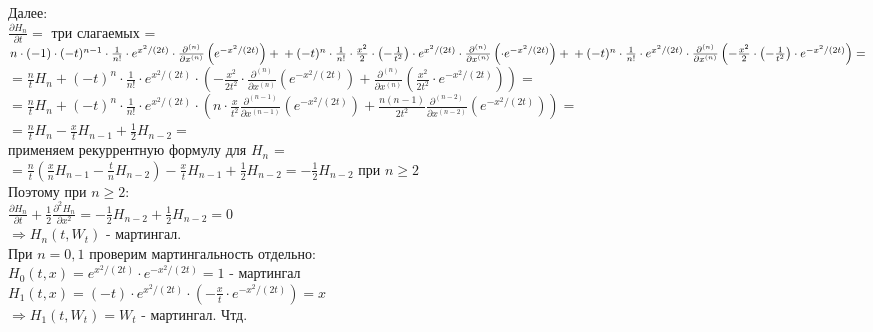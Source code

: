 \documentclass[12pt]{article}
\begin{document}
 Далее:\\
 $\frac {\partial H_n}{\partial t} =$ {три слагаемых} = \\
$ n \cdot (-1) \cdot  (-t)^{n-1} \cdot \frac{1}{n!}  \cdot e^{x^2/(2t)} \cdot  \frac {\partial^{(n)}}{\partial x^{(n)}} \left( e^{-x^2/(2t)} \right) + \\
 +(-t)^n \cdot \frac{1}{n!}  \cdot \frac{x^2}{2} \cdot \left( -\frac{1}{t^2} \right)  \cdot e^{x^2/(2t)} \cdot  \frac {\partial^{(n)}}{\partial x^{(n)}} \left( \cdot e^{-x^2/(2t)} \right) +\\
+ (-t)^n \cdot \frac{1}{n!}  \cdot e^{x^2/(2t)} \cdot  \frac {\partial^{(n)}}{\partial x^{(n)}} \left( - \frac{x^2}{2}\cdot \left( -\frac{1}{t^2} \right)   \cdot e^{-x^2/(2t)} \right)=$\\
$=\frac{n}{t}H_n +  (-t)^n \cdot \frac{1}{n!}  \cdot e^{x^2/(2t)} \cdot \left(  -\frac{x^2}{2t^2} \cdot  \frac {\partial^{(n)}}{\partial x^{(n)}} \left( e^{-x^2/(2t)} \right) + \frac {\partial^{(n)}}{\partial x^{(n)}} \left(  \frac{x^2}{2t^2} \cdot e^{-x^2/(2t)} \right) \right)=$\\
$=\frac{n}{t}H_n +  
(-t)^n \cdot \frac{1}{n!}  \cdot e^{x^2/(2t)} \cdot \left( n \cdot \frac{x}{t^2} \frac {\partial^{(n-1)}}{\partial x^{(n-1)}} \left( e^{-x^2/(2t)} \right)  + 
\frac{n(n-1)}{2t^2} \frac {\partial^{(n-2)}}{\partial x^{(n-2)}} \left( e^{-x^2/(2t)} \right) \right)=$\\
$=\frac{n}{t}H_n -\frac{x}{t}H_{n-1} + \frac{1}{2}H_{n-2} =$\\
применяем рекуррентную формулу для $H_{n}$ = \\
$=\frac{n}{t}\left( \frac{x}{n} H_{n-1} - \frac{t}{n} H_{n-2} \right) -\frac{x}{t}H_{n-1} + \frac{1}{2}H_{n-2}= -\frac{1}{2}H_{n-2}$ при $n\geq2$\\

Поэтому при $n\geq2:$\\
$\frac {\partial H_n}{\partial t} + \frac{1}{2}  \frac {\partial^2 H_n}{\partial x^2} =-\frac{1}{2}H_{n-2}  + \frac{1}{2}H_{n-2} = 0$\\
$\Rightarrow H_n(t,W_t)$ - мартингал.\\

При $n=0,1$ проверим мартингальность отдельно:\\
$H_0(t,x)=e^{x^2/(2t)} \cdot e^{-x^2/(2t)} = 1$ - мартингал\\
$H_1(t,x)= (-t) \cdot e^{x^2/(2t)} \cdot  \left( -\frac{x}{t} \cdot e^{-x^2/(2t)} \right) = x$\\
$\Rightarrow H_1(t,W_t) = W_t$ - мартингал. Чтд.
\end{document}
